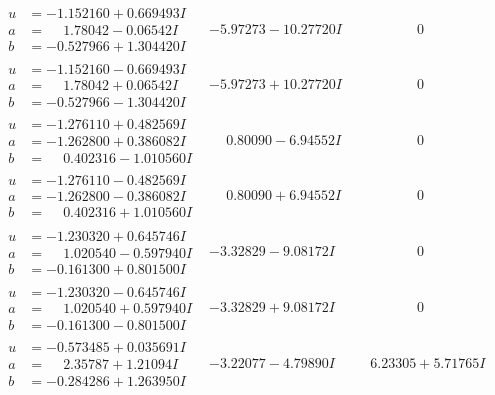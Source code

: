 \documentclass[1p]{elsarticle_modified}
\theoremstyle{definition}
\begin{document}
$$\begin{array}{c|c|c}
\begin{aligned}
u &= -1.152160 + 0.669493 I \\
a &= \phantom{-}1.78042 - 0.06542 I \\
b &= -0.527966 + 1.304420 I\end{aligned}
 & -5.97273 - 10.27720 I & \phantom{-0.000000 } 0 \\ \hline\begin{aligned}
u &= -1.152160 - 0.669493 I \\
a &= \phantom{-}1.78042 + 0.06542 I \\
b &= -0.527966 - 1.304420 I\end{aligned}
 & -5.97273 + 10.27720 I & \phantom{-0.000000 } 0 \\ \hline\begin{aligned}
u &= -1.276110 + 0.482569 I \\
a &= -1.262800 + 0.386082 I \\
b &= \phantom{-}0.402316 - 1.010560 I\end{aligned}
 & \phantom{-}0.80090 - 6.94552 I & \phantom{-0.000000 } 0 \\ \hline\begin{aligned}
u &= -1.276110 - 0.482569 I \\
a &= -1.262800 - 0.386082 I \\
b &= \phantom{-}0.402316 + 1.010560 I\end{aligned}
 & \phantom{-}0.80090 + 6.94552 I & \phantom{-0.000000 } 0 \\ \hline\begin{aligned}
u &= -1.230320 + 0.645746 I \\
a &= \phantom{-}1.020540 - 0.597940 I \\
b &= -0.161300 + 0.801500 I\end{aligned}
 & -3.32829 - 9.08172 I & \phantom{-0.000000 } 0 \\ \hline\begin{aligned}
u &= -1.230320 - 0.645746 I \\
a &= \phantom{-}1.020540 + 0.597940 I \\
b &= -0.161300 - 0.801500 I\end{aligned}
 & -3.32829 + 9.08172 I & \phantom{-0.000000 } 0 \\ \hline\begin{aligned}
u &= -0.573485 + 0.035691 I \\
a &= \phantom{-}2.35787 + 1.21094 I \\
b &= -0.284286 + 1.263950 I\end{aligned}
 & -3.22077 - 4.79890 I & \phantom{-}6.23305 + 5.71765 I \\ \hline\begin{aligned}

\end{aligned}
\end{array}$$
\end{document}
